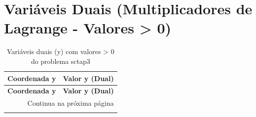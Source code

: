 \documentclass[12pt]{article}
\begin{document}
\section{Variáveis Duais (Multiplicadores de Lagrange - Valores > 0)}

\begin{longtable}{@{}cc@{}}
\caption{Variáveis duais (y) com valores > 0 do problema sctap3} \\
\toprule
\textbf{Coordenada y} & \textbf{Valor y (Dual)} \\
\midrule
\endfirsthead

\toprule
\textbf{Coordenada y} & \textbf{Valor y (Dual)} \\
\midrule
\endhead

\midrule \multicolumn{2}{r}{{Continua na próxima página}} \\ \midrule
\endfoot


\end{longtable}
\end{document}

